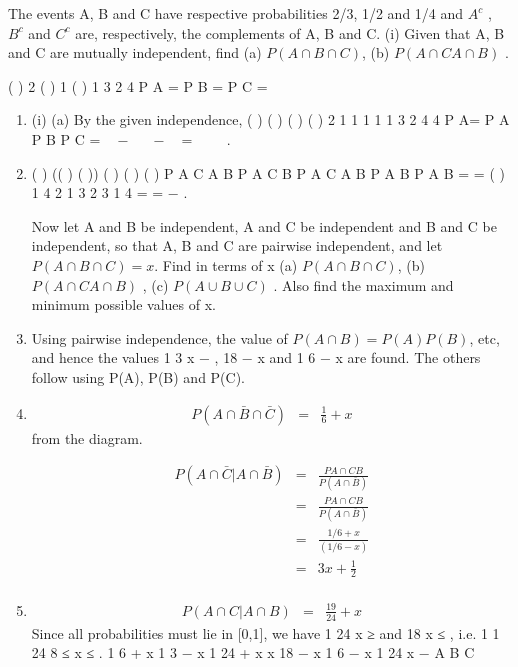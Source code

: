 \documentclass[a4paper,12pt]{article}
\begin{document}
\begin{framed}
The events A, B and C have respective probabilities 2/3, 1/2 and 1/4
 and $A^c$ , $B^c$ and $C^c$
are, respectively, the complements of A, B and C.
(i) Given that A, B and C are mutually independent, find
(a) $P(A \cap B \cap C)$,
(b) $P(A\cap C A \cap B)$ .
\end{framed}


( ) 2 ( ) 1 ( ) 1
3 2 4
P A = P B = P C =
\begin{enumerate}
\item (i) (a) By the given independence,
( ) ( ) ( ) ( ) 2 1 1 1 1 1
3 2 4 4
P A\capB \capC = P A P B P C =  −  −  =
  
.
\item ( ) (( ) ( ))
( )
( )
( )
P A C A B P A C B
P A C A B
P A B P A B
\cap \cap \cap \cap \cap
\cap \cap = =
\cap \cap
( )
1
4
2 1
3 2
3
1 4
= =
−
.

\newpage
\begin{framed}
Now let A and B be independent, A and C be independent and B and C be
independent, so that A, B and C are pairwise independent, and let
$P( A \cap B \cap C) = x$. Find in terms of x
(a) $P(A \cap B \cap C)$,
(b) $P(A∩C A \cap B)$ ,
(c) $P( A \cup B \cup C)$ .
Also find the maximum and minimum possible values of x.
\end{framed}
\item 
Using pairwise independence, the value of $P( A\cap B) = P(A)P(B)$, etc, and
hence the values 1
3 x − , 18
− x and 1
6 − x are found. The others follow using
P(A), P(B) and P(C).
\item  
\begin{eqnarray*}
P \left(A\cap \bar{B} \cap \bar{C} \right) &=& \frac{1}{6}+ x
\end{eqnarray*} from the diagram.

\begin{eqnarray*}
P (A\cap \bar{C}| A \cap \bar{B}) &=& \frac{ P A  \cap C B}{P(A\cap \bar{B})} \\
&=& \frac{ P A  \cap C B}{P(A \cap \bar{B})} \\
&=& \frac{1/6 + x }{(1/6-x)} \\
&=& 3x+\frac{1}{2} \\
\end{eqnarray*}

\item 
\begin{eqnarray*}
P (A\cap C| A \cap B) &=& \frac{19}{24} + x
\end{eqnarray*}
Since all probabilities must lie in [0,1], we have 1
24 x ≥ and 18
x ≤ , i.e.
1 1
24 8
≤ x ≤ .
1
6 + x 1
3 − x 1
24 + x
x 18
− x 1
6 − x
1
24 x −
A B
C
\end{enumerate}
\end{document}
